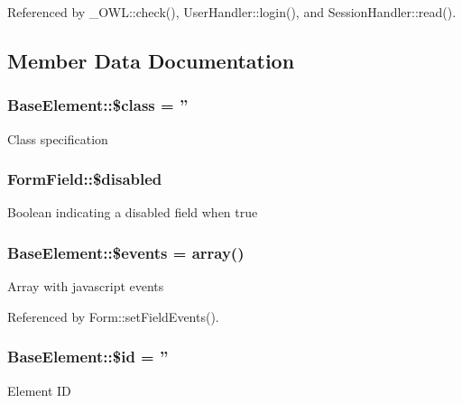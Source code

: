 Referenced by \_\-OWL::check(), UserHandler::login(), and SessionHandler::read().



\subsection{Member Data Documentation}
\subsubsection[{\$class}]{\setlength{\rightskip}{0pt plus 5cm}BaseElement::\$class = ''}\label{classBaseElement_a99976a8e967db92e7800309f359b0803}
Class specification 
\subsubsection[{\$disabled}]{\setlength{\rightskip}{0pt plus 5cm}FormField::\$disabled}\label{classFormField_ab6f1907061890290e32cb2befc0a5f50}
Boolean indicating a disabled field when true 
\subsubsection[{\$events}]{\setlength{\rightskip}{0pt plus 5cm}BaseElement::\$events = array()}\label{classBaseElement_a02cebe45d277b4ff8f29db08bad371ba}
Array with javascript events 

Referenced by Form::setFieldEvents().

\subsubsection[{\$id}]{\setlength{\rightskip}{0pt plus 5cm}BaseElement::\$id = ''}\label{classBaseElement_a11b6989c43b53869a09f5ce65aa55b45}
Element ID 
